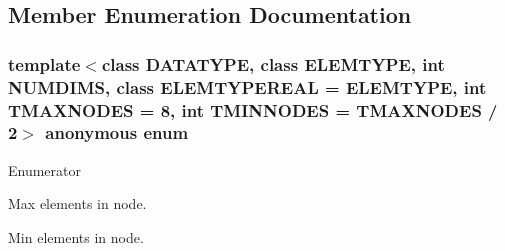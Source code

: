 \subsection{Member Enumeration Documentation}
\hypertarget{classRTree_afaccb2e611f17ff46b623771ad7043d7}{\subsubsection[{anonymous enum}]{\setlength{\rightskip}{0pt plus 5cm}template$<$class D\-A\-T\-A\-T\-Y\-P\-E, class E\-L\-E\-M\-T\-Y\-P\-E, int N\-U\-M\-D\-I\-M\-S, class E\-L\-E\-M\-T\-Y\-P\-E\-R\-E\-A\-L = E\-L\-E\-M\-T\-Y\-P\-E, int T\-M\-A\-X\-N\-O\-D\-E\-S = 8, int T\-M\-I\-N\-N\-O\-D\-E\-S = T\-M\-A\-X\-N\-O\-D\-E\-S / 2$>$ anonymous enum}}\label{classRTree_afaccb2e611f17ff46b623771ad7043d7}
\begin{Desc}
\item[Enumerator]\par
\begin{description}
\item[{\em 
\hypertarget{classRTree_afaccb2e611f17ff46b623771ad7043d7ac05afe446df73fa67991e5199453a37f}{M\-A\-X\-N\-O\-D\-E\-S}\label{classRTree_afaccb2e611f17ff46b623771ad7043d7ac05afe446df73fa67991e5199453a37f}
}]Max elements in node. \item[{\em 
\hypertarget{classRTree_afaccb2e611f17ff46b623771ad7043d7a3be3d8c82fd5bfbd5e5a496e9877d71a}{M\-I\-N\-N\-O\-D\-E\-S}\label{classRTree_afaccb2e611f17ff46b623771ad7043d7a3be3d8c82fd5bfbd5e5a496e9877d71a}
}]Min elements in node. \end{description}
\end{Desc}


